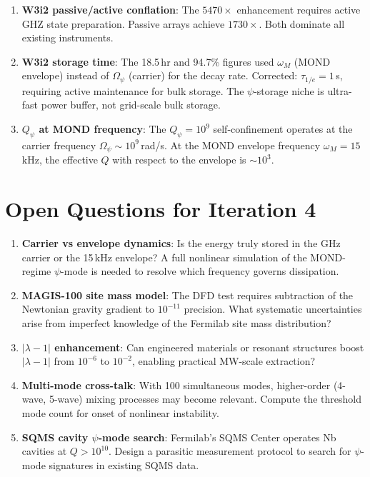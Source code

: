 \documentclass[11pt]{article}
\theoremstyle{definition}
\theoremstyle{remark}
\newcommand{\Qpsi}{Q_\psi}
\newcommand{\Opsi}{\Omega_\psi}
\begin{document}
\begin{enumerate}
\item \textbf{W3i2 passive/active conflation}: The $5470\times$
enhancement requires active GHZ state preparation. Passive arrays
achieve $1730\times$. Both dominate all existing instruments.

\item \textbf{W3i2 storage time}: The 18.5\,hr and 94.7\% figures
used $\omega_M$ (MOND envelope) instead of $\Opsi$ (carrier) for
the decay rate. Corrected: $\tau_{1/e} = 1$\,s, requiring active
maintenance for bulk storage. The $\psi$-storage niche is
ultra-fast power buffer, not grid-scale bulk storage.

\item \textbf{$\Qpsi$ at MOND frequency}: The $\Qpsi = 10^9$
self-confinement operates at the carrier frequency $\Opsi \sim 10^9$\,rad/s.
At the MOND envelope frequency $\omega_M = 15$\,kHz, the effective
$Q$ with respect to the envelope is $\sim 10^3$.
\end{enumerate}

\section*{Open Questions for Iteration 4}

\begin{enumerate}
\item \textbf{Carrier vs envelope dynamics}: Is the energy truly stored
in the GHz carrier or the 15\,kHz envelope? A full nonlinear simulation
of the MOND-regime $\psi$-mode is needed to resolve which frequency
governs dissipation.

\item \textbf{MAGIS-100 site mass model}: The DFD test requires
subtraction of the Newtonian gravity gradient to $10^{-11}$ precision.
What systematic uncertainties arise from imperfect knowledge of the
Fermilab site mass distribution?

\item \textbf{$|\lambda - 1|$ enhancement}: Can engineered materials
or resonant structures boost $|\lambda - 1|$ from $10^{-6}$ to
$10^{-2}$, enabling practical MW-scale extraction?

\item \textbf{Multi-mode cross-talk}: With 100 simultaneous modes,
higher-order (4-wave, 5-wave) mixing processes may become relevant.
Compute the threshold mode count for onset of nonlinear instability.

\item \textbf{SQMS cavity $\psi$-mode search}: Fermilab's SQMS Center
operates Nb cavities at $Q > 10^{10}$. Design a parasitic measurement
protocol to search for $\psi$-mode signatures in existing SQMS data.
\end{enumerate}
\end{document}
